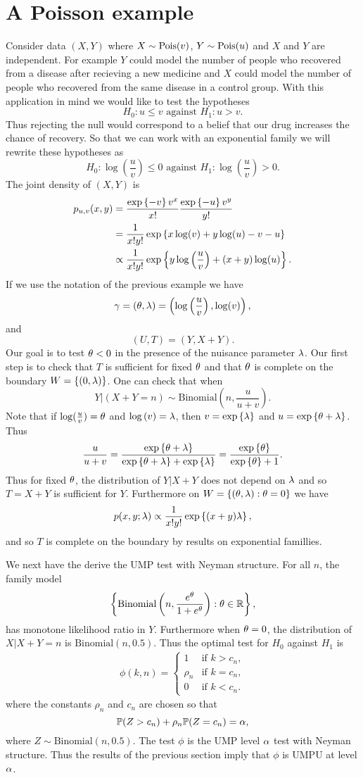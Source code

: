 \section{A Poisson example}
Consider data $(X,Y)$ where $X \sim \text{Pois}(v)$, $Y\sim \text{Pois}(u)$ and $X$ and $Y$ are independent. For example $Y$ could model the number of people who recovered from a disease after recieving a new medicine and $X$ could model the number of people who recovered from the same disease in a control group. With this application in mind we would like to test the hypotheses
\[H_0 : u \le v \text{ against } H_1 : u > v.\]
Thus rejecting the null would correspond to a belief that our drug increases the chance of recovery. So that we can work with an exponential family we will rewrite these hypotheses as 
\[H_0 : \log\left(\frac{u}{v}\right) \le 0\text{ against } H_1 : \log\left(\frac{u}{v}\right) > 0. \]
The joint density of $(X,Y)$ is
\begin{align*}
    p_{u,v}(x,y) &= \frac{\exp\left\{-v\right\}v^x}{x!}\frac{\exp\left\{-u\right\}v^y}{y!}\\
    &= \frac{1}{x!y!}\exp\left\{x\log(v)+y\log(u)-v-u\right\}\\
    &\propto \frac{1}{x!y!}\exp\left\{y\log\left(\frac{u}{v}\right)+(x+y)\log(u)\right\}.
\end{align*}
If we use the notation of the previous example we have 
\[\gamma = ({\theta}, \lambda) = \left(\log\left(\frac{u}{v}\right), \log(v)\right),\]
and 
\[(U,T) = (Y,X+Y).\]
Our goal is to test ${\theta} < 0$ in the presence of the nuisance parameter $\lambda$. Our first step is to check that $T$ is sufficient for fixed ${\theta}$ and that ${\theta}$ is complete on the boundary $W=\{(0,\lambda)\}$. One can check that when
\[Y|(X+Y=n) \sim \text{Binomial}\left(n,\frac{u}{u+v}\right).\]
Note that if $\log(\frac{u}{v}) = {\theta}$ and $\log\left(v\right)=\lambda$, then $v = \exp\left\{\lambda\right\}$ and $u = \exp\left\{{\theta}+\lambda\right\}$. Thus 
\[\frac{u}{u+v} = \frac{\exp\left\{{\theta}+\lambda\right\}}{\exp\left\{{\theta}+\lambda\right\}+\exp\left\{\lambda\right\}}=\frac{\exp\left\{{\theta}\right\}}{\exp\left\{{\theta}\right\}+1}.\]
Thus for fixed ${\theta}$, the distribution of $Y|X+Y$ does not depend on $\lambda$ and so $T=X+Y$ is sufficient for $Y$. Furthermore on $W=\{({\theta},\lambda) : {\theta} = 0\}$ we have
\[p(x,y;\lambda) \propto \frac{1}{x!y!}\exp\left\{(x+y)\lambda\right\}, \]
and so $ T$ is complete on the boundary by results on exponential famillies. 


We next have the derive the UMP test with Neyman structure. For all $n$, the family model \[\left\{\text{Binomial}\left(n,\frac{e^{{\theta}}}{1+e^{{\theta}}}\right): {\theta} \in {\mathbb R}\right\},\] has monotone likelihood ratio in $Y$. Furthermore when ${\theta}=0$, the distribution of $X|X+Y=n$ is $\text{Binomial}(n,0.5)$. Thus the optimal test for $H_0$ against $H_1$ is
\begin{align*}
    \phi(k,n) = \begin{cases}
        1 & \text{if } k > c_n,\\
        \rho_n & \text{if } k = c_n,\\
        0 & \text{if } k < c_n.
    \end{cases}
\end{align*}
where the constants $\rho_n$ and $c_n$ are chosen so that 
\[{\mathbb{P}}(Z>c_n)+\rho_n{\mathbb{P}}(Z=c_n) ={\alpha}, \]
where $Z \sim \text{Binomial}(n,0.5)$. The test $\phi$ is the UMP level ${\alpha}$ test with Neyman structure. Thus the results of the previous section imply that $\phi$ is UMPU at level ${\alpha}$.
